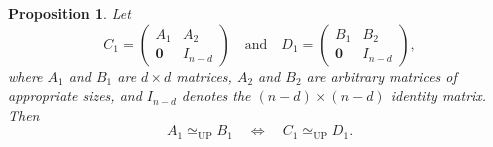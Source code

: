 \documentclass[reqno, 12pt]{article}
\newtheorem{prop}[thm]{Proposition}
\theoremstyle{mydefinition}
\theoremstyle{myremark}
\numberwithin{algorithm}{section}
\begin{document}
\begin{prop}\label{prop-up-pry}
Let
\[
C_1 = \begin{pmatrix}
A_1 & A_2 \\
\mathbf{0} & I_{n-d}
\end{pmatrix}
\quad \text{and} \quad
D_1 = \begin{pmatrix}
B_1 & B_2 \\
\mathbf{0} & I_{n-d}
\end{pmatrix},
\]
where $A_1$ and $B_1$ are $d \times d$ matrices, $A_2$ and $B_2$ are arbitrary matrices of appropriate sizes, and $I_{n-d}$ denotes the $(n-d) \times (n-d)$ identity matrix. Then
\begin{equation}\label{equ-up-pyr}
A_1 \simeq_{\mathrm{UP}} B_1 \quad \Longleftrightarrow \quad C_1 \simeq_{\mathrm{UP}} D_1.
\end{equation}
\end{prop}
\end{document}
